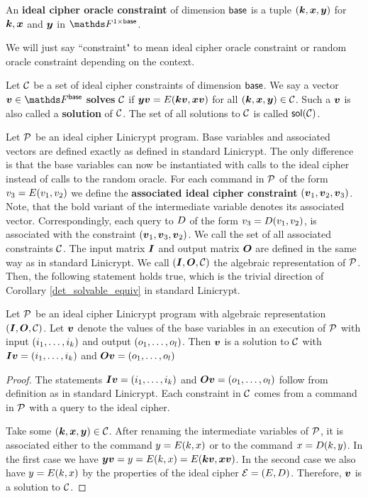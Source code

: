 \begin{defn}
An \textbf{ideal cipher oracle constraint} of dimension $\base$ is a tuple $(\vk, \vx, \vy)$ for
$\vk, \vx$ and $\vy$ in $\F^{1 \times \base}$.
\end{defn}

We will just say ``constraint" to mean ideal cipher oracle constraint or random oracle constraint depending on the context.

\begin{defn}
    Let $\C$ be a set of ideal cipher constraints of dimension $\base$.
    We say a vector $\vv \in \Base$ \textbf{solves} $\C$ if
    $\vy \vv = \E(\vk \vv, \vx \vv)$ for all $(\vk, \vx, \vy) \in \C$.
    Such a $\vv$ is also called a \textbf{solution} of $\C$.
    The set of all solutions to $\C$ is called $\sol(\C)$.
\end{defn}

Let $\P$ be an ideal cipher Linicrypt program.
Base variables and associated vectors are defined exactly as defined in standard Linicrypt.
The only difference is that the base variables can now be instantiated with calls to the ideal cipher instead of calls to the random oracle.
For each command in $\P$ of the form $v_3 = \E(v_1,v_2)$
we define the \textbf{associated ideal cipher constraint} $(\vv_1, \vv_2, \vv_3)$.
Note, that the bold variant of the intermediate variable denotes its associated vector.
Correspondingly, each query to $\D$ of the form $v_3 = \D(v_1,v_2)$,
is associated with the constraint $(\vv_1, \vv_3, \vv_2)$.
We call the set of all associated constraints $\C$. 
The input matrix $\I$ and output matrix $\O$ are defined in the same way as in standard Linicrypt.
We call $(\I,\O,\C)$ the algebraic representation of $\P$.
Then, the following statement holds true, which is the trivial direction of Corollary \ref{det_solvable_equiv} in standard Linicrypt.

\begin{lemma}
    Let $\P$ be an ideal cipher Linicrypt program with algebraic representation $(\I,\O,\C)$.
    Let $\vv$ denote the values of the base variables in an execution of $\P$ with input $(\dts i k)$ and output $(\dts o l)$.
    Then $\vv$ is a solution to $\C$ with $\I\vv = (\dts i k)$ and $\O\vv = (\dts o l)$
\end{lemma}

\begin{proof}
    The statements $\I\vv = (\dts i k)$ and $\O\vv = (\dts o l)$ follow from definition as in standard Linicrypt.
    Each constraint in $\C$ comes from a command in $\P$ with a query to the ideal cipher.

    Take some $(\vk, \vx, \vy) \in \C$.
    After renaming the intermediate variables of $\P$,
    it is associated either to the command $y = \E(k, x)$ or to the command $x = \D(k, y)$.
    In the first case we have $\vy\vv = y = \E(k, x) = \E(\vk\vv, \vx\vv)$.
    In the second case we also have $y = \E(k,x)$
    by the properties of the ideal cipher $\mathcal{E} = (\E,\D)$.
    Therefore, $\vv$ is a solution to $\C$.
\end{proof}

